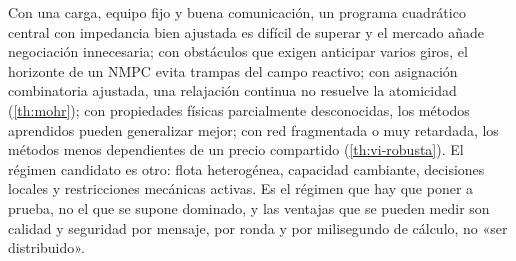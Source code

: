 \begin{observacion}
\label{obs:regimen-ventaja}
Con una carga, equipo fijo y buena comunicación, un programa cuadrático
central con impedancia bien ajustada es difícil de superar y el mercado añade
negociación innecesaria; con obstáculos que exigen anticipar varios giros, el
horizonte de un NMPC evita trampas del campo reactivo; con asignación
combinatoria ajustada, una relajación continua no resuelve la atomicidad
(\cref{th:mohr}); con propiedades físicas parcialmente desconocidas, los
métodos aprendidos pueden generalizar mejor; con red fragmentada o muy
retardada, los métodos menos dependientes de un precio compartido
(\cref{th:vi-robusta}). El régimen candidato es otro: flota heterogénea,
capacidad cambiante, decisiones locales y restricciones mecánicas activas. Es
el régimen que hay que poner a prueba, no el que se supone dominado, y las
ventajas que se pueden medir son calidad y seguridad por mensaje, por ronda y
por milisegundo de cálculo, no «ser distribuido».
\end{observacion}
